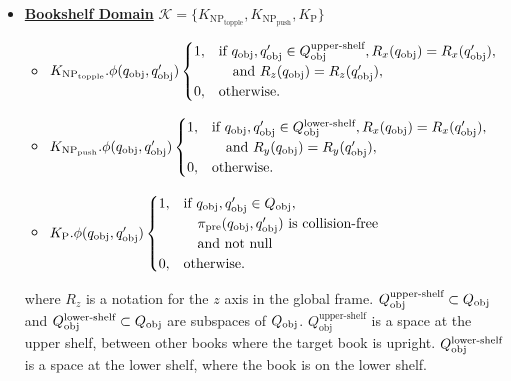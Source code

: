 \begin{definition}
\begin{itemize}
        \item \underline{\textbf{Bookshelf Domain}} $\mathcal{K}=\{K_{\text{NP}_\text{topple}},K_{\text{NP}_\text{push}},K_{\text{P}}\}$
            \begin{itemize}
                \item \(K_{\text{NP}_\text{topple}}.\phi(q_\text{obj}, q'_\text{obj}) \\ 
                \begin{cases} 
                1, & \text{if } q_\text{obj}, q'_\text{obj} \in Q_\text{obj}^\text{upper-shelf}, R_x(q_\text{obj}) = R_x(q'_\text{obj}), \\ 
                & \quad \text{and } R_z(q_\text{obj}) = R_z(q'_\text{obj}), \\ 
                0, & \text{otherwise.} 
                \end{cases}\)
                \item \(K_{\text{NP}_\text{push}}.\phi(q_\text{obj}, q'_\text{obj}) \\
                \begin{cases} 
                1, & \text{if } q_\text{obj}, q'_\text{obj} \in Q_\text{obj}^\text{lower-shelf}, R_x(q_\text{obj}) = R_x(q'_\text{obj}), \\ 
                & \quad \text{and } R_y(q_\text{obj}) = R_y(q'_\text{obj}), \\ 
                0, & \text{otherwise.} 
                \end{cases}\)

                \item \(K_{\text{P}}.\phi(q_\text{obj}, q'_\text{obj}) \\
                \begin{cases} 
                1, & \text{if } q_\text{obj}, q'_\text{obj} \in Q_\text{obj}, \\
                &\quad \pi_\text{pre}(q_\text{obj}, q'_\text{obj}) \text{ is collision-free} \\
                & \quad \text{and not null} \\ 
                0, & \text{otherwise.} 
                \end{cases}\)
            \end{itemize}
        where \( R_z \) is a notation for the \( z \) axis in the global frame. $Q_{\text{obj}}^{\text{upper-shelf}} \subset Q_\text{obj}$ and $Q_{\text{obj}}^{\text{lower-shelf}} \subset Q_\text{obj}$ are subspaces of $Q_\text{obj}$. $Q_{\text{obj}}^{\text{upper-shelf}}$ is a space at the upper shelf, between other books where the target book is upright. $Q_\text{obj}^\text{lower-shelf}$ is a space at the lower shelf, where the book is on the lower shelf.


\end{itemize}
\end{definition}
